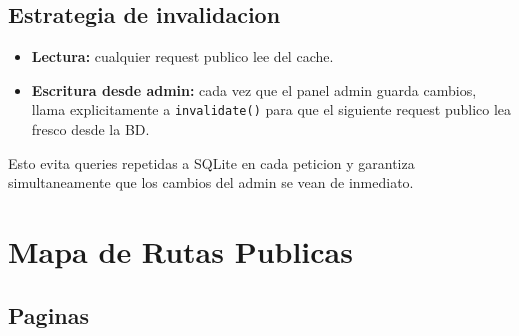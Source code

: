 \documentclass[11pt,a4paper]{article}
\begin{document}
\subsection{Estrategia de invalidacion}

\begin{itemize}[leftmargin=*]
    \item \textbf{Lectura:} cualquier request publico lee del cache.
    \item \textbf{Escritura desde admin:} cada vez que el panel admin
        guarda cambios, llama explicitamente a \texttt{invalidate()} para
        que el siguiente request publico lea fresco desde la BD.
\end{itemize}

Esto evita queries repetidas a SQLite en cada peticion y garantiza
simultaneamente que los cambios del admin se vean de inmediato.

\section{Mapa de Rutas Publicas}

\subsection{Paginas}
\end{document}
